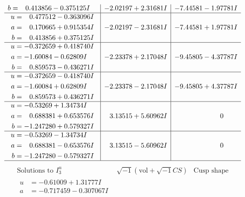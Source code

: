 \documentclass[1p]{elsarticle_modified}
\theoremstyle{definition}
\newcommand{\I}{\sqrt{-1}}
\begin{document}
$$\begin{array}{c|c|c}
\begin{aligned}
b &= \phantom{-}0.413856 - 0.375125 I\end{aligned}
 & -2.02197 + 2.31681 I & -7.44581 - 1.97781 I \\ \hline\begin{aligned}
u &= \phantom{-}0.477512 - 0.363096 I \\
a &= \phantom{-}0.170665 + 0.915354 I \\
b &= \phantom{-}0.413856 + 0.375125 I\end{aligned}
 & -2.02197 - 2.31681 I & -7.44581 + 1.97781 I \\ \hline\begin{aligned}
u &= -0.372659 + 0.418740 I \\
a &= -1.60084 - 0.62809 I \\
b &= \phantom{-}0.859573 - 0.436271 I\end{aligned}
 & -2.23378 + 2.17048 I & -9.45805 - 4.37787 I \\ \hline\begin{aligned}
u &= -0.372659 - 0.418740 I \\
a &= -1.60084 + 0.62809 I \\
b &= \phantom{-}0.859573 + 0.436271 I\end{aligned}
 & -2.23378 - 2.17048 I & -9.45805 + 4.37787 I \\ \hline\begin{aligned}
u &= -0.53269 + 1.34734 I \\
a &= \phantom{-}0.688381 + 0.653576 I \\
b &= -1.247280 + 0.579327 I\end{aligned}
 & \phantom{-}3.13515 + 5.60962 I & \phantom{-0.000000 } 0 \\ \hline\begin{aligned}
u &= -0.53269 - 1.34734 I \\
a &= \phantom{-}0.688381 - 0.653576 I \\
b &= -1.247280 - 0.579327 I\end{aligned}
 & \phantom{-}3.13515 - 5.60962 I & \phantom{-0.000000 } 0\\
 \hline 
 \end{array}$$\newpage$$\begin{array}{c|c|c}  
\text{Solutions to }I^u_{3}& \I (\text{vol} + \sqrt{-1}CS) & \text{Cusp shape}\\
 \hline 
\begin{aligned}
u &= -0.61009 + 1.31777 I \\
a &= -0.717459 - 0.307067 I \\

\end{aligned}
\end{array}$$
\end{document}
